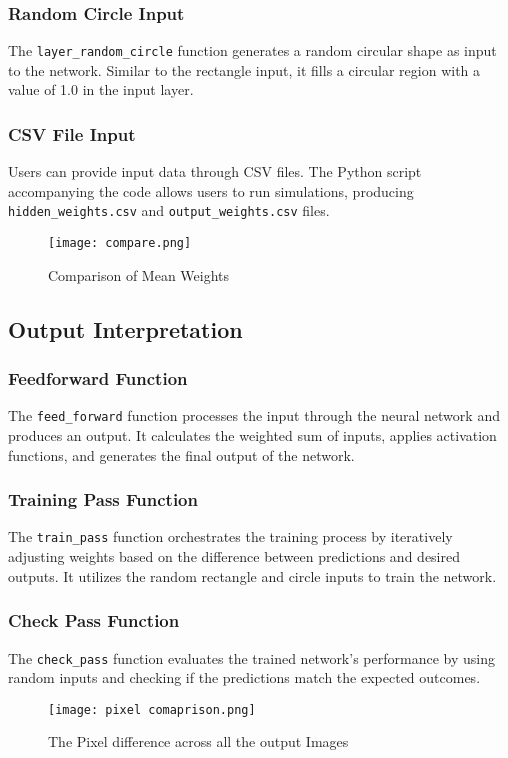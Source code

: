 \documentclass{article}
\begin{document}
\subsubsection*{Random Circle Input}
The \texttt{layer\_random\_circle} function generates a random circular shape as input to the network. Similar to the rectangle input, it fills a circular region with a value of 1.0 in the input layer.

\subsubsection*{CSV File Input}
Users can provide input data through CSV files. The Python script accompanying the code allows users to run simulations, producing \texttt{hidden\_weights.csv} and \texttt{output\_weights.csv} files.

\begin{figure}[H]
    \centering
    \texttt{[image: compare.png]}
    \caption{Comparison of Mean Weights}
    \label{fig:compare}
\end{figure}

\subsection{Output Interpretation}

\subsubsection*{Feedforward Function}
The \texttt{feed\_forward} function processes the input through the neural network and produces an output. It calculates the weighted sum of inputs, applies activation functions, and generates the final output of the network.

\subsubsection*{Training Pass Function}
The \texttt{train\_pass} function orchestrates the training process by iteratively adjusting weights based on the difference between predictions and desired outputs. It utilizes the random rectangle and circle inputs to train the network.

\subsubsection*{Check Pass Function}
The \texttt{check\_pass} function evaluates the trained network's performance by using random inputs and checking if the predictions match the expected outcomes.
\begin{figure}[H]
    \centering
    \texttt{[image: pixel comaprison.png]}
    \caption{The Pixel difference across all the output Images}
    \label{fig:Pixel_difference}
\end{figure}
\end{document}
